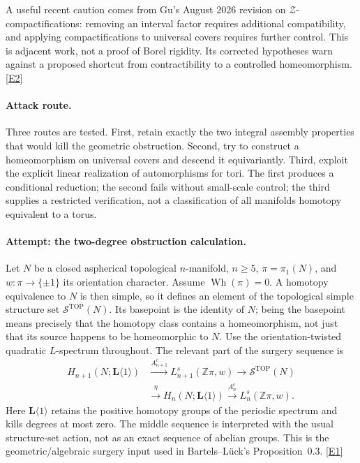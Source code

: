 \documentclass[11pt,a4paper]{article}
\newcommand{\Z}{\mathbb{Z}}
\newcommand{\eref}[2]{\hyperlink{extra:#1:#2}{[E#2]}}
\numberwithin{equation}{section}
\begin{document}
A useful recent caution comes from Gu's August 2026 revision on
$\mathcal Z$-compactifications: removing an interval factor requires
additional compatibility, and applying compactifications to universal
covers requires further control. This is adjacent work, not a proof of
Borel rigidity. Its corrected hypotheses warn against a proposed shortcut
from contractibility to a controlled homeomorphism. \eref{115}{2}

\paragraph{Attack route.}
Three routes are tested. First, retain exactly the two integral assembly
properties that would kill the geometric obstruction. Second, try to
construct a homeomorphism on universal covers and descend it equivariantly.
Third, exploit the explicit linear realization of automorphisms for tori.
The first produces a conditional reduction; the second fails without
small-scale control; the third supplies a restricted verification, not a
classification of all manifolds homotopy equivalent to a torus.

\paragraph{Attempt: the two-degree obstruction calculation.}
Let $N$ be a closed aspherical topological $n$-manifold, $n\geq5$,
$\pi=\pi_1(N)$, and $w:\pi\to\{\pm1\}$ its orientation character.
Assume $\operatorname{Wh}(\pi)=0$. A homotopy equivalence to $N$ is then
simple, so it defines an element of the topological simple structure set
$\mathcal S^{\mathrm{TOP}}(N)$. Its basepoint is the identity of $N$;
being the basepoint means precisely that the homotopy class contains a
homeomorphism, not just that its source happens to be homeomorphic to $N$.
Use the orientation-twisted quadratic $L$-spectrum throughout.
The relevant part of the surgery sequence is
\begin{equation}\label{eq:115:surgery}
\begin{split}
 H_{n+1}(N;\mathbf L\langle1\rangle)&\xrightarrow{A^c_{n+1}}
 L^s_{n+1}(\Z\pi,w)\longrightarrow\mathcal S^{\mathrm{TOP}}(N)\\
 &\xrightarrow{\eta}H_n(N;\mathbf L\langle1\rangle)
 \xrightarrow{A^c_n}L^s_n(\Z\pi,w).
\end{split}
\end{equation}
Here $\mathbf L\langle1\rangle$ retains the positive homotopy groups
of the periodic spectrum and kills degrees at most zero. The middle
sequence is interpreted with the usual structure-set action, not as an
exact sequence of abelian groups. This is the geometric/algebraic surgery
input used in Bartels--L\"uck's Proposition~0.3. \eref{115}{1}
\end{document}
